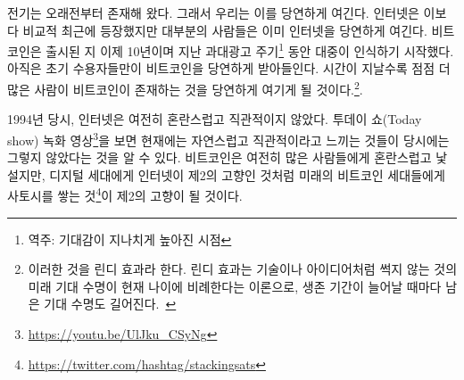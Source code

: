 \begin{comment}
	Electricity has been around for a while now. We take it for granted. The
	internet is quite a bit younger, but most people already take it for
	granted as well. Bitcoin is ten years old and has entered public
	consciousness during the last hype cycle. Only the earliest of adopters
	take it for granted. As more time passes, more and more people will
	recognize Bitcoin as something which simply is.\footnote{This is known as the
		\textit{Lindy Effect}. The Lindy effect is a theory that the future life expectancy
		of some non-perishable things like a technology or an idea is proportional to
		their current age, so that every additional period of survival implies a longer
		remaining life expectancy.~\cite{wiki:lindy}}
\end{comment}
전기는 오래전부터 존재해 왔다. 그래서 우리는 이를 당연하게 여긴다.
인터넷은 이보다 비교적 최근에 등장했지만 대부분의 사람들은 이미 인터넷을 당연하게 여긴다.
비트코인은 출시된 지 이제 10년이며 지난 과대광고 주기\footnote{역주: 기대감이 지나치게 높아진 시점} 동안 대중이 인식하기 시작했다.
아직은 초기 수용자들만이 비트코인을 당연하게 받아들인다.
시간이 지날수록 점점 더 많은 사람이 비트코인이 존재하는 것을 당연하게 여기게 될 것이다.\footnote{이러한 것을
	린디 효과라 한다. 린디 효과는 기술이나 아이디어처럼 썩지 않는 것의 미래 기대 수명이 현재 나이에 비례한다는 이론으로,
	생존 기간이 늘어날 때마다 남은 기대 수명도 길어진다.~\cite{wiki:lindy}}.

\begin{comment}
	In 1994, the internet was still confusing and unintuitive. Watching this old
	recording of the \textit{Today
		Show}\footnote{\url{https://youtu.be/UlJku_CSyNg}} makes it obvious that what
	feels natural and intuitive now actually wasn't back then. Bitcoin is still
	confusing and alien to most, but just like the internet is second nature for
	digital natives, spending and stacking
	sats\footnote{\url{https://twitter.com/hashtag/stackingsats}} will be second
	nature to the bitcoin natives of the future.
\end{comment}
1994년 당시, 인터넷은 여전히 혼란스럽고 직관적이지 않았다. 
투데이 쇼(Today show) 녹화 영상\footnote{\url{https://youtu.be/UlJku_CSyNg}}을 보면 
현재에는 자연스럽고 직관적이라고 느끼는 것들이 당시에는 그렇지 않았다는 것을 알 수 있다.
비트코인은 여전히 많은 사람들에게 혼란스럽고 낯설지만, 
디지털 세대에게 인터넷이 제2의 고향인 것처럼 
미래의 비트코인 세대들에게 사토시를 쌓는 것\footnote{\url{https://twitter.com/hashtag/stackingsats}}이 제2의 고향이 될 것이다.

